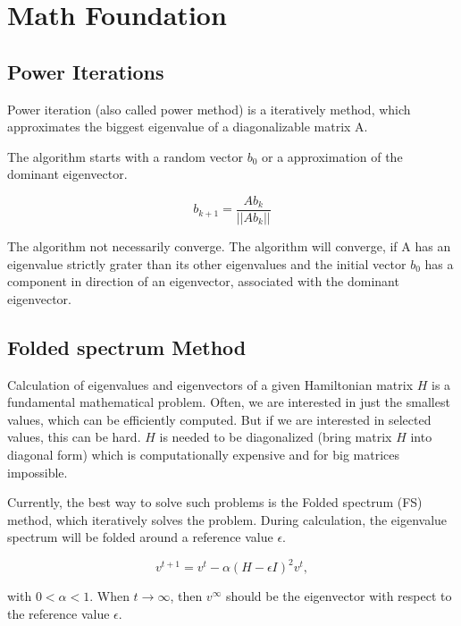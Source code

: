 \section{Math Foundation}


\subsection{Power Iterations}
\label{sec:powerIterations}

Power iteration (also called power method) is a iteratively method, 
which approximates the biggest eigenvalue of a diagonalizable matrix A.

The algorithm starts with a random vector $b_0$ or a approximation of the dominant eigenvector.

\begin{equation}
    b_{k+1} = \frac{Ab_k}{||Ab_k||}
\end{equation}

The algorithm not necessarily converge. The algorithm will converge, if A has an eigenvalue strictly grater than its other eigenvalues
and the initial vector $b_0$ has a component in direction of an eigenvector, associated with the dominant eigenvector.

\subsection{Folded spectrum Method}
\label{sec:FoldedSpectrumMethod}
Calculation of eigenvalues and eigenvectors of a given Hamiltonian matrix $H$ 
is a fundamental mathematical problem. Often, we are interested in just the smallest 
values, which can be efficiently computed. But if we are interested in selected values,
this can be hard. $H$ is needed to be diagonalized (bring matrix $H$ into diagonal form) 
which is computationally expensive and for big matrices impossible.

Currently, the best way to solve such problems is the Folded spectrum (FS) \cite{foldedSpectrumMethod} method,
which iteratively solves the problem. During calculation, the eigenvalue spectrum will be folded around a reference 
value $\epsilon$.

\begin{equation}
    v^{t+1} = v^t - \alpha (H - \epsilon I )^2 v^t ,
\end{equation}

with $0 < \alpha < 1$. When $t \rightarrow \infty$, then $v^{\infty}$ should be the 
eigenvector with respect to the reference value $\epsilon$.

